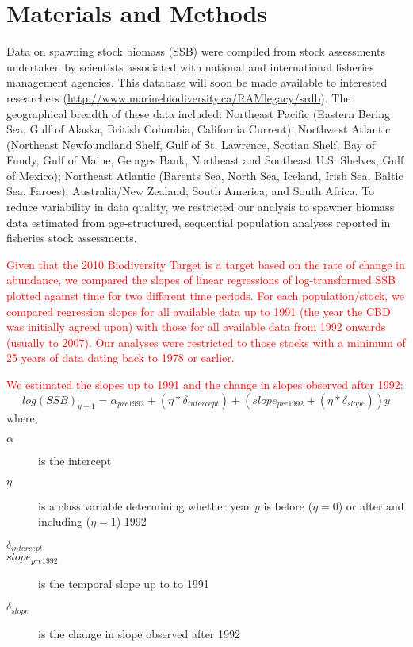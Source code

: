 \documentclass[letterpaper,12pt]{article}
\begin{document}
\section{Materials and Methods} 
Data on spawning stock biomass (SSB) were compiled from stock
assessments undertaken by scientists associated with national and
international fisheries management agencies.  This database will soon
be made available to interested researchers
(\url{http://www.marinebiodiversity.ca/RAMlegacy/srdb}). The
geographical breadth of these data included: Northeast Pacific
(Eastern Bering Sea, Gulf of Alaska, British Columbia, California
Current); Northwest Atlantic (Northeast Newfoundland Shelf, Gulf of
St. Lawrence, Scotian Shelf, Bay of Fundy, Gulf of Maine, Georges
Bank, Northeast and Southeast U.S. Shelves, Gulf of Mexico); Northeast
Atlantic (Barents Sea, North Sea, Iceland, Irish Sea, Baltic Sea,
Faroes); Australia/New Zealand; South America; and South Africa. To
reduce variability in data quality, we restricted our analysis to
spawner biomass data estimated from age-structured, sequential
population analyses reported in fisheries stock assessments.  

\textcolor{red}{Given that the 2010 Biodiversity Target is a target based on the rate
of change in abundance, we compared the slopes of linear regressions
of log-transformed SSB plotted against time for two different time
periods. For each population/stock, we compared regression slopes for
all available data up to 1991 (the year the CBD was initially
agreed upon) with those for all available data from 1992 onwards
(usually to 2007). Our analyses were restricted to those stocks with a
minimum of 25 years of data dating back to 1978 or earlier.}

\textcolor{red}{
We estimated the slopes up to 1991 and the change in slopes observed
after 1992:}
\begin{equation}
log(SSB)_{y+1} = \alpha_{pre1992} + (\eta * \delta_{intercept}) +(slope_{pre1992}+(\eta * \delta_{slope}))y 
\end{equation}
where,
\begin{description}
\item[$\alpha$]{is the intercept}
\item[$\eta$]{is a class variable determining whether year $y$ is before ($\eta=0$) or after and including ($\eta=1$) 1992}
\item[$\delta_{intercept}$]{}
\item[$slope_{pre1992}$]{is the temporal slope up to to 1991}
\item[$\delta_{slope}$]{is the change in slope observed after 1992}
\end{description}
\end{document}
